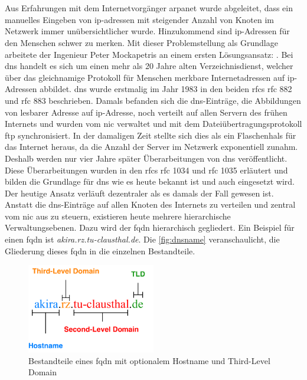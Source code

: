 \documentclass[titlepage]{report}
\begin{document}
\section*{}
Aus Erfahrungen mit dem Internetvorgänger \gls{arpanet} wurde
abgeleitet, dass ein manuelles Eingeben von \gls{ip}\hyp{}adressen mit
steigender Anzahl von Knoten im Netzwerk immer unübersichtlicher wurde.
Hinzukommend sind \gls{ip}\hyp{}Adressen für den Menschen schwer zu
merken. Mit dieser Problemstellung als Grundlage arbeitete der Ingenieur
Peter Mockapetris an einem ersten Lösungsansatz: .
Bei \gls{dns} handelt es sich um einen mehr als 20 Jahre alten
Verzeichnisdienst, welcher über das gleichnamige Protokoll für Menschen
merkbare Internetadressen auf \gls{ip}\hyp{}Adressen abbildet.
\gls{dns} wurde erstmalig im Jahr 1983 in den beiden \glspl{rfc}
\gls{rfc} 882\cite{RFC0882} und \gls{rfc} 883\cite{RFC0883} beschrieben.
Damals befanden sich die \gls{dns}\hyp{}Einträge, die Abbildungen von
lesbarer Adresse auf \gls{ip}\hyp{}Adresse, noch verteilt auf
allen Servern des frühen Internets und wurden vom \gls{nic} verwaltet
und mit dem Dateiübertragungsprotokoll \gls{ftp}
synchronisiert\cite{RFC1034}. In der damaligen Zeit stellte sich dies
als ein Flaschenhals für das Internet heraus, da die Anzahl der Server
im Netzwerk exponentiell zunahm. Deshalb werden nur vier Jahre später
Überarbeitungen von \gls{dns} veröffentlicht. Diese Überarbeitungen
wurden in den \glspl{rfc} \gls{rfc} 1034 und \gls{rfc} 1035 erläutert
und bilden die Grundlage für \gls{dns} wie es heute bekannt ist und auch
eingesetzt wird. Der heutige Ansatz verläuft dezentraler als es damals
der Fall gewesen ist. Anstatt die \gls{dns}\hyp{}Einträge auf allen
Knoten des Internets zu verteilen und zentral vom \gls{nic} aus zu
steuern, existieren heute mehrere hierarchische Verwaltungsebenen. Dazu
wird der \gls{fqdn} hierarchisch gegliedert. Ein Beispiel für einen
\gls{fqdn} ist \emph{akira.rz.tu-clausthal.de}. Die
\autoref{fig:dnsname} veranschaulicht, die Gliederung dieses \gls{fqdn} in die
einzelnen Bestandteile.
\begin{figure}[H]
    \centering
    \includegraphics[width=0.5\textwidth]{figures/dnsname.pdf}
    \caption{Bestandteile eines \gls{fqdn} mit optionalem Hostname und Third-Level
    Domain}\label{fig:dnsname}
\end{figure}
\end{document}
